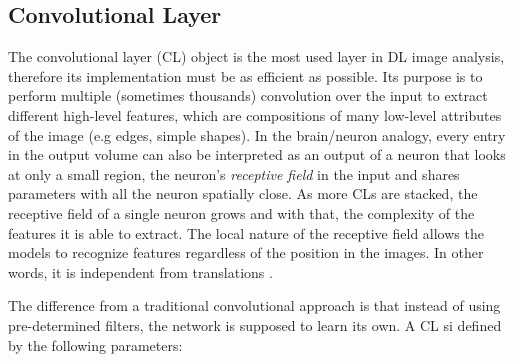 \documentclass[12pt,a4paper]{report}
\begin{document}
\subsection*{Convolutional Layer}

The convolutional layer (CL) object is the most used layer in DL image analysis, therefore its implementation must be as efficient as possible.
Its purpose is to perform multiple (sometimes thousands) convolution over the input to extract different high-level features, which are compositions of many low-level attributes of the image (e.g edges, simple shapes).
In the brain/neuron analogy, every entry in the output volume can also be interpreted as an output of a neuron that looks at only a small region, the neuron's {\it receptive field} in the input and shares parameters with all the neuron spatially close.
As more CLs are stacked, the receptive field of a single neuron grows and with that, the complexity of the features it is able to extract.
The local nature of the receptive field allows the models to recognize features regardless of the position in the images. In other words, it is independent from translations \cite{Goodfellow-et-al-2016}. 

The difference from a traditional convolutional approach is that instead of using pre-determined filters, the network is supposed to learn its own.
A CL si defined by the following parameters: 
\end{document}
